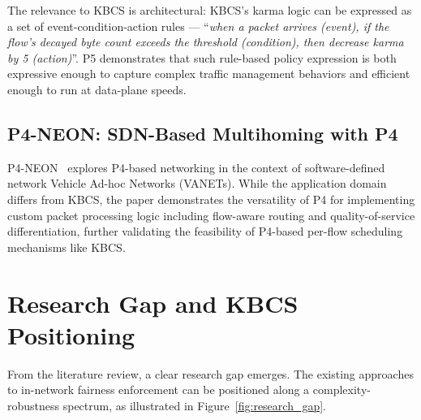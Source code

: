 \documentclass[12pt,a4paper]{report}
\begin{document}
The relevance to KBCS is architectural: KBCS's karma logic can be expressed as a set of event-condition-action rules — ``\textit{when a packet arrives (event), if the flow's decayed byte count exceeds the threshold (condition), then decrease karma by 5 (action)}''. P5 demonstrates that such rule-based policy expression is both expressive enough to capture complex traffic management behaviors and efficient enough to run at data-plane speeds.

\subsection{P4-NEON: SDN-Based Multihoming with P4}
P4-NEON~\cite{p4neon} explores P4-based networking in the context of software-defined network Vehicle Ad-hoc Networks (VANETs). While the application domain differs from KBCS, the paper demonstrates the versatility of P4 for implementing custom packet processing logic including flow-aware routing and quality-of-service differentiation, further validating the feasibility of P4-based per-flow scheduling mechanisms like KBCS.

\section{Research Gap and KBCS Positioning}
From the literature review, a clear research gap emerges. The existing approaches to in-network fairness enforcement can be positioned along a complexity-robustness spectrum, as illustrated in Figure~\ref{fig:research_gap}.
\end{document}
